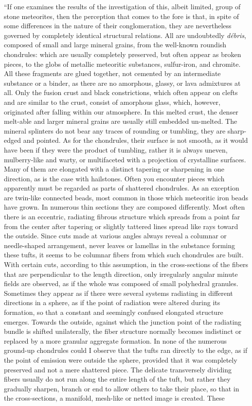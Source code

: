 \documentclass[a4paper, 12pt, oneside]{article}
\begin{document}
``If one examines the results of the investigation of this, albeit limited, group of stone meteorites, then the perception that comes to the fore is that, in spite of some differences in the nature of their conglomeration, they are nevertheless governed by completely identical structural relations. All are undoubtedly \emph{débris}, composed of small and large mineral grains, from the well-known roundish chondrules: which are usually completely preserved, but often appear as broken pieces, to the globs of metallic meteoritic substances, sulfur-iron, and chromite. All these fragments are glued together, not cemented by an intermediate substance or a binder, as there are no amorphous, glassy, or lava admixtures at all. Only the fusion crust and black constrictions, which often appear on clefts and are similar to the crust, consist of amorphous glass, which, however, originated after falling within our atmosphere. In this melted crust, the denser melt-able and larger mineral grains are usually still embedded un-melted. The mineral splinters do not bear any traces of rounding or tumbling, they are sharp-edged and pointed. As for the chondrules, their surface is not smooth, as it would have been if they were the product of tumbling, rather it is always uneven, mulberry-like and warty, or multifaceted with a projection of crystalline surfaces. Many of them are elongated with a distinct tapering or sharpening in one direction, as is the case with hailstones. Often you encounter pieces which apparently must be regarded as parts of shattered chondrules. As an exception are twin-like connected beads, most common in those which meteoritic iron beads have grown. In numerous thin sections they are composed differently. Most often there is an eccentric, radiating fibrous structure which spreads from a point far from the center after tapering or slightly tattered lines spread like rays toward the outside. Since cuts made at various angles always reveal a columnar or needle-shaped arrangement, never leaves or lamellas in the substance forming these tufts, it seems to be columnar fibers from which such chondrules are built. With certain cuts, according to this assumption, in the cross-sections of the fibers that are perpendicular to the length direction, only irregularly angular minute fields are observed, as if the whole was composed of small polyhedral granules. Sometimes they appear as if there were several systems radiating in different directions in a sphere, as if the point of radiation were altered during its formation, so that a constant and seemingly confused elongated structure emerges. Towards the outside, against which the junction point of the radiating bundle is shifted unilaterally, the fiber structure normally becomes indistinct or replaced by a more granular aggregate formation. In none of the numerous ground-up chondrules could I observe that the tufts ran directly to the edge, as if the point of emission were outside the sphere, provided that it was completely preserved and not a mere shattered piece. The delicate transversely dividing fibers usually do not run along the entire length of the tuft, but rather they gradually sharpen, branch or end to allow others to take their place, so that in the cross-sections, a manifold, mesh-like or netted image is created. These 
\end{document}
